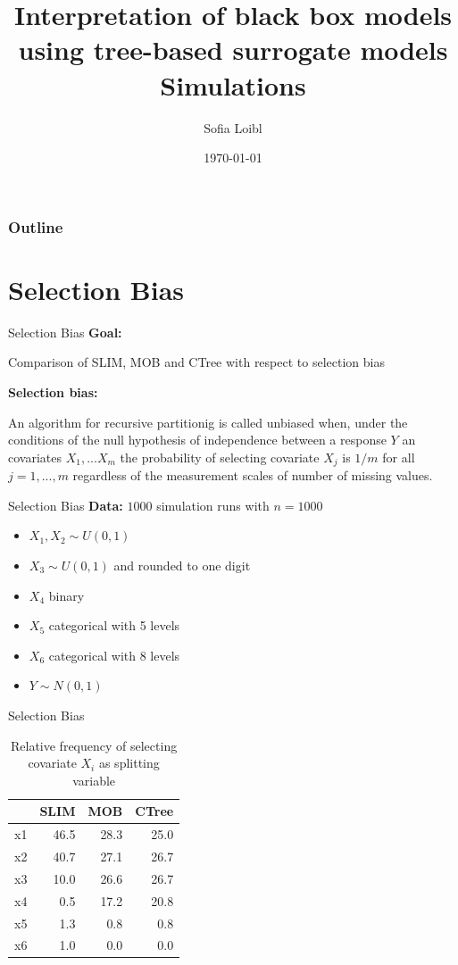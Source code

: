 \documentclass[9pt, xcolor=table]{beamer}
\title[Interpretation of black box models]{Interpretation of black box models using tree-based surrogate models \newline \small{Simulations}}
\author[Sofia Loibl]{Sofia Loibl}
\institute[LMU]{LMU München}
\date{\today}
\begin{document}
\begin{frame}
\titlepage 
\end{frame}


\begin{frame}
\frametitle{Outline} 
\tableofcontents 
\end{frame}

\section{Selection Bias}
\begin{frame}{Selection Bias}
\textbf{Goal:} 

Comparison of SLIM, MOB and CTree with respect to selection bias
\vspace{0.5cm}


\textbf{Selection bias:} 

An algorithm for recursive partitionig is called unbiased when, under the conditions of the null hypothesis of independence between a response $Y$ an covariates $X_{1},...X_{m}$ the probability of selecting covariate $X_{j}$ is $1/m$ for all $j = 1,...,m$ regardless of the measurement scales of number of missing values. \citep{Hothorn.2006}

\end{frame}

\begin{frame}{Selection Bias}
\textbf{Data:}  $1000$ simulation runs with $n= 1000$
\begin{itemize}
    \item $X_{1}, X_{2} \sim U(0,1) $
    \item $X_{3} \sim U(0,1)$ and rounded to one digit
    \item $X_{4}$ binary
    \item $X_{5}$ categorical with 5 levels
    \item $X_{6}$ categorical with 8 levels
    \item $Y \sim N(0,1)$

\end{itemize}

\end{frame}
\begin{frame}{Selection Bias}
\begin{table}
\caption{Relative frequency of selecting covariate $X_i$ as splitting variable}

\centering
\begin{tabular}[t]{l|r|r|r}
\hline
  & SLIM & MOB & CTree\\
\hline
x1 & 46.5 & 28.3 & 25.0\\
x2 & 40.7 & 27.1 & 26.7\\
x3 & 10.0 & 26.6 & 26.7\\
x4 & 0.5 & 17.2 & 20.8\\
x5 & 1.3 & 0.8 & 0.8\\
x6 & 1.0 & 0.0 & 0.0\\
\hline
\end{tabular}
\end{table}
\end{frame}
\end{document}
